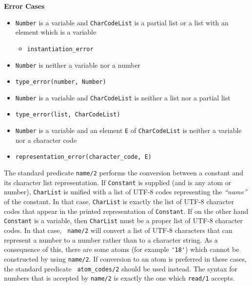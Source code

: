 \begin{description}
{\bf Error Cases}
\begin{itemize}
\item {\tt Number} is a variable and {\tt CharCodeList} is a partial
  list or a list with an element which is a variable
\begin{itemize}
\item {\tt instantiation\_error}
\end{itemize}
\item {\tt Number} is neither a variable nor a number
\bi
\item {\tt type\_error(number, Number)}
\ei
\item {\tt Number} is a variable and {\tt CharCodeList} is neither a
  list nor a partial list 
\bi
\item {\tt type\_error(list, CharCodeList)}
\ei
\item {\tt Number} is a variable and an element {\tt E} of {\tt CharCodeList} is neither a
variable nor a character code
\bi
\item {\tt representation\_error(character\_code, E)}
\ei
\end{itemize}

%
The standard predicate {\tt name/2} performs the conversion between a
constant and its character list representation.  If {\tt Constant} is
supplied (and is any atom or number), {\tt CharList} is unified with a
list of UTF-8 codes representing the {\em ``name''} of the constant.
In that case, {\tt CharList} is exactly the list of UTF-8 character
codes that appear in the printed representation of {\tt Constant}\@.
If on the other hand {\tt Constant} is a variable, then {\tt CharList}
must be a proper list of UTF-8 character codes.  In that case, {\tt
  name/2} will convert a list of UTF-8 characters that can represent a
number to a number rather than to a character string.  As a
consequence of this, there are some atoms (for example \verb|'18'|)
which cannot be constructed by using {\tt name/2}\@.  If conversion to
an atom is preferred in these cases, the standard predicate {\tt
  atom\_codes/2} should be used instead. The syntax for numbers that
is accepted by {\tt name/2} is exactly the one which {\tt read/1}
accepts.  



\end{description}
